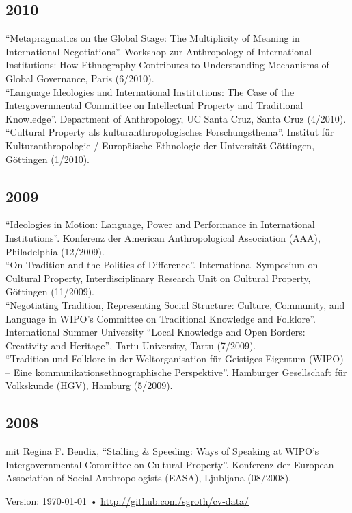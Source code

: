 \documentclass[11pt, a4paper]{article} %
\begin{document}
\subsection*{2010}
\enquote{Metapragmatics on the Global Stage: The Multiplicity of Meaning in International Negotiations}. Workshop zur Anthropology of International Institutions: How Ethnography Contributes to Understanding Mechanisms of Global Governance, Paris (6/2010).\\[.25cm]
\enquote{Language Ideologies and International Institutions: The Case of the Intergovernmental Committee on Intellectual Property and Traditional Knowledge}. Department of Anthropology, UC Santa Cruz, Santa Cruz (4/2010).\\[.25cm]
\enquote{Cultural Property als kulturanthropologisches Forschungsthema}. Institut für Kulturanthropologie / Europäische Ethnologie der Universität Göttingen, Göttingen (1/2010).
\subsection*{2009}
\enquote{Ideologies in Motion: Language, Power and Performance in International Institutions}. Konferenz der American Anthropological Association (AAA), Philadelphia (12/2009).\\[.25cm]
\enquote{On Tradition and the Politics of Difference}. International Symposium on Cultural Property, Interdisciplinary Research Unit on Cultural Property, Göttingen (11/2009).\\[.25cm]
\enquote{Negotiating Tradition, Representing Social Structure: Culture, Community, and Language in WIPO’s Committee on Traditional Knowledge and Folklore}. International Summer University “Local Knowledge and Open Borders: Creativity and Heritage”, Tartu University, Tartu (7/2009).\\[.25cm]
\enquote{Tradition und Folklore in der Weltorganisation für Geistiges Eigentum (WIPO) – Eine kommunikationsethnographische Perspektive}. Hamburger Gesellschaft für Volkskunde (HGV), Hamburg (5/2009).
\subsection*{2008}
mit Regina F. Bendix, \enquote{Stalling \& Speeding: Ways of Speaking at WIPO’s Intergovernmental Committee on Cultural Property}. Konferenz der European Association of Social Anthropologists (EASA), Ljubljana (08/2008).
\vfill{} %
\begin{center}
{\scriptsize Version: \today\- •\- \href{http://github.com/sgroth/cv-data/}{http://github.com/sgroth/cv-data/}} 
\end{center}
\end{document}
